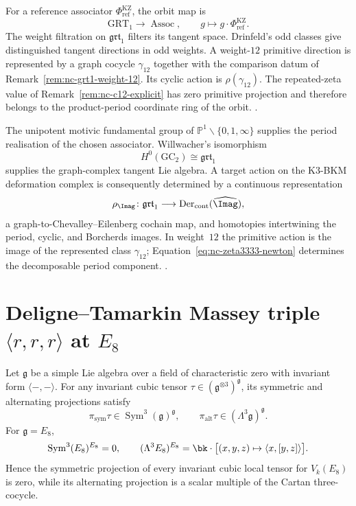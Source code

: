\begin{remark}
\label{rem:nc-grt1-explicit-orbit}
For a reference associator
\(\Phi^{\mathrm{KZ}}_{\mathrm{ref}}\), the orbit map is
\[
 \mathrm{GRT}_1\longrightarrow\operatorname{Assoc},
 \qquad
 g\longmapsto g\cdot\Phi^{\mathrm{KZ}}_{\mathrm{ref}}.
\]
The weight filtration on \(\mathfrak{grt}_1\) filters its tangent
space.  Drinfeld's odd classes give distinguished tangent directions
in odd weights.  A weight-$12$ primitive direction is represented by
a graph cocycle \(\gamma_{12}\) together with the comparison datum of
Remark~\ref{rem:nc-grt1-weight-12}.  Its cyclic action is
\(\rho(\gamma_{12})\).  The repeated-zeta value of
Remark~\ref{rem:nc-c12-explicit} has zero primitive projection and
therefore belongs to the product-period coordinate ring of the orbit.
\cite{Drinfeld1990,Willwacher2015,Brown2012}.
\end{remark}

\begin{remark}
\label{rem:nc-grt1-motivic-geometric}
The unipotent motivic fundamental group of
\(\mathbb P^1\smallsetminus\{0,1,\infty\}\) supplies the period
realisation of the chosen associator.  Willwacher's isomorphism
\[
 H^0(\mathrm{GC}_2)\cong\mathfrak{grt}_1
\]
supplies the graph-complex tangent Lie algebra.  A target action on
the K3-BKM deformation complex is consequently determined by a
continuous representation
\[
 \rho_{\Imag}\colon\mathfrak{grt}_1
 \longrightarrow
 \operatorname{Der}_{\mathrm{cont}}(\widehat{\Imag}),
\]
a graph-to-Chevalley--Eilenberg cochain map, and homotopies
intertwining the period, cyclic, and Borcherds images.  In weight~$12$
the primitive action is the image of the represented class
\(\gamma_{12}\); Equation~\eqref{eq:nc-zeta3333-newton} determines
the decomposable period component.
\cite{DeligneGoncharov2005,Drinfeld1990,Willwacher2015,Brown2012}.
\end{remark}

\section{Deligne--Tamarkin Massey triple $\langle r, r, r\rangle$ at $E_8$}
\label{sec:nc-massey-triple-rrr}

\begin{proposition}
\label{prop:nc-massey-triple-rrr-E8}
\ClaimStatusProvedHere
Let \(\mathfrak g\) be a simple Lie algebra over a field of
characteristic zero with invariant form \(\langle-,-\rangle\).
For any invariant cubic tensor
\(\tau\in(\mathfrak g^{\otimes3})^{\mathfrak g}\), its symmetric and
alternating projections satisfy
\[
 \pi_{\mathrm{sym}}\tau\in
 \operatorname{Sym}^3(\mathfrak g)^{\mathfrak g},
 \qquad
 \pi_{\mathrm{alt}}\tau\in
 (\Lambda^3\mathfrak g)^{\mathfrak g}.
\]
For \(\mathfrak g=E_8\),
\[
 \operatorname{Sym}^3(E_8)^{E_8}=0,
 \qquad
 (\Lambda^3E_8)^{E_8}
 =\bk\cdot\bigl[(x,y,z)\mapsto\langle x,[y,z]\rangle\bigr].
\]
Hence the symmetric projection of every invariant cubic local tensor
for \(V_k(E_8)\) is zero, while its alternating projection is a scalar
multiple of the Cartan three-cocycle.
\end{proposition}

